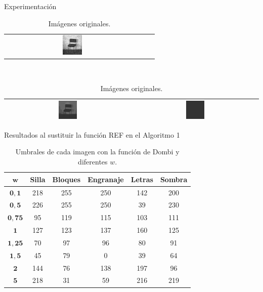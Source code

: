 \documentclass{beamer}
\theoremstyle{plain} %
\theoremstyle{definition}
\newcommand{\bb}{\bfseries}
\begin{document}
\begin{frame}[squeeze]{Experimentación}
\begin{table}
\begin{tabular}{ccc}
    \includegraphics[width=0.15\textwidth]{img/orig/chairsp020.jpg}\\
    \end{tabular}\\
    \begin{tabular}{cc}
    \includegraphics[width=0.15\textwidth]{img/orig/chairbcon.jpg} &
    \includegraphics[width=0.15\textwidth]{img/orig/chairmuybcon.jpg}\\\hline
    \end{tabular}
  \caption{Imágenes originales.}
  \end{table}
\end{frame}

\begin{frame}{Resultados al sustituir la función REF en el Algoritmo 1}
  \begin{table}
  \centering
  \begin{tabular}{c||c|c|c|c|c} 
  $\mathbf{w}$    &\bb Silla&\bb Bloques&\bb Engranaje&\bb Letras&\bb Sombra\\\hline\hline
  $\mathbf{0,1}$  &   218   &    255    &     250     &   142    &   200  \\\hline
  $\mathbf{0,5}$  &   226   &    255    &     250     &    39    &   230  \\\hline
  $\mathbf{0,75}$ &    95   &    119    &     115     &   103    &   111  \\\hline
  $\mathbf{1}$    &   127   &    123    &     137     &   160    &   125  \\\hline
  $\mathbf{1,25}$ &    70   &     97    &      96     &    80    &    91  \\\hline
  $\mathbf{1,5}$  &    45   &     79    &      0      &    39    &    64  \\\hline
  $\mathbf{2}$    &   144   &     76    &     138     &   197    &    96  \\\hline
  $\mathbf{5}$    &   218   &     31    &      59     &   216    &   219  \\\hline
  \end{tabular}
  \caption{Umbrales de cada imagen con la función de Dombi y diferentes $w$.\label{tab:resultexp1dombi}}
  \end{table}
\end{frame}
\end{document}
